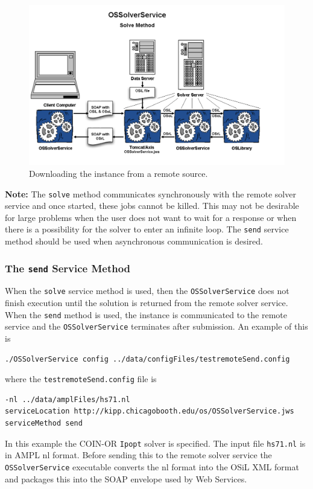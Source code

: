 \begin{figure}
\centering
\includegraphics[scale=0.5]{./figures/Figure11.png}
\caption{Downloading the instance from a remote source.}
\label{figure:ossolverservice2}
\end{figure}

{\bf Note:} The {\tt solve} method communicates synchronously with the remote solver service
and once started, these jobs cannot be killed. This may not be desirable for large
problems when the user does not want to wait for a response or when there is a possibility
for the solver to enter an infinite loop. The {\tt send} service
method should be used when asynchronous communication is desired.


\subsubsection{The  {\tt send} Service Method}\label{section:send}

When the {\tt solve} service method is used, then the {\tt OSSolverService} does not
finish execution until the solution is returned from the remote solver service.
 When the {\tt send}
method is used, the instance is communicated to the remote service and the
{\tt OSSolverService} terminates after submission. An example of this is
\begin{verbatim}
./OSSolverService config ../data/configFiles/testremoteSend.config
\end{verbatim}
where the {\tt testremoteSend.config} file is
\begin{verbatim}
-nl ../data/amplFiles/hs71.nl
serviceLocation http://kipp.chicagobooth.edu/os/OSSolverService.jws
serviceMethod send
\end{verbatim}
In this example the COIN-OR {\tt Ipopt} solver is specified. The input file {\tt hs71.nl}
is in AMPL nl format.
Before sending this to the remote solver service the {\tt OSSolverService} executable converts  
the nl format into the OSiL XML format and packages this 
into the SOAP envelope used by Web Services.

